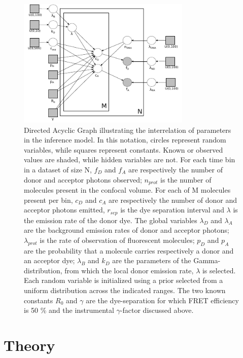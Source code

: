 \begin{figure}[b]
   \begin{center}
      \includegraphics*[width=3.25in]{inference/S2_plate_DAG_model.pdf}
      \caption{Directed Acyclic Graph illustrating the interrelation of parameters in the inference model.  In this notation, circles represent random variables, while squares represent constants.  Known or observed values are shaded, while hidden variables are not.  For each time bin in a dataset of size N, $f_D$ and $f_A$ are respectively the number of donor and acceptor photons observed; $n_{prot}$ is the number of molecules present in the confocal volume.  For each of M molecules present per bin, $c_{D}$ and $c_{A}$ are respectively the number of donor and acceptor photons emitted, $r_{sep}$ is the dye separation interval and $\lambda$ is the emission rate of the donor dye.  The global variables $\lambda_{D}$ and $\lambda_{A}$ are the background emission rates of donor and acceptor photons; $\lambda_{prot}$ is the rate of observation of fluorescent molecules; $p_{D}$ and $p_{A}$ are the probability that a molecule carries respectively a donor and an acceptor dye; $\lambda_B$ and $k_D$ are the parameters of the Gamma-distribution, from which the local donor emission rate, $\lambda$ is selected.  Each random variable is initialized using a prior selected from a uniform distribution across the indicated ranges.  The two known constants $R_0$ and $\gamma$ are the dye-separation for which FRET efficiency is 50 \% and the instrumental $\gamma$-factor discussed above.}
      \label{fig:plate_DAG}
   \end{center}
\end{figure}


\section{Theory}
